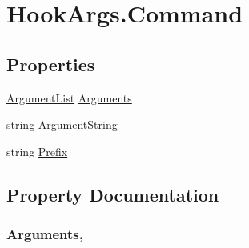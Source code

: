 \hypertarget{structOTA_1_1Plugin_1_1HookArgs_1_1Command}{}\section{Hook\+Args.\+Command}
\label{structOTA_1_1Plugin_1_1HookArgs_1_1Command}
\subsection*{Properties}
\begin{DoxyCompactItemize}
\item 
\hyperlink{classOTA_1_1Command_1_1ArgumentList}{Argument\+List} \hyperlink{structOTA_1_1Plugin_1_1HookArgs_1_1Command_a8dd3d15558c01f578c7d1d9085b9a77d}{Arguments}
\item 
string \hyperlink{structOTA_1_1Plugin_1_1HookArgs_1_1Command_a26c3571b3256a575cb30f8435920b6ba}{Argument\+String}
\item 
string \hyperlink{structOTA_1_1Plugin_1_1HookArgs_1_1Command_a0bf9d0add9f4a8c150513d661361598c}{Prefix}
\end{DoxyCompactItemize}


\subsection{Property Documentation}
\hypertarget{structOTA_1_1Plugin_1_1HookArgs_1_1Command_a8dd3d15558c01f578c7d1d9085b9a77d}{}
\subsubsection[{Arguments}]{ Arguments\hspace{0.3cm}{\ttfamily [get]}, {\ttfamily [set]}}\label{structOTA_1_1Plugin_1_1HookArgs_1_1Command_a8dd3d15558c01f578c7d1d9085b9a77d}
\hypertarget{structOTA_1_1Plugin_1_1HookArgs_1_1Command_a26c3571b3256a575cb30f8435920b6ba}{}
